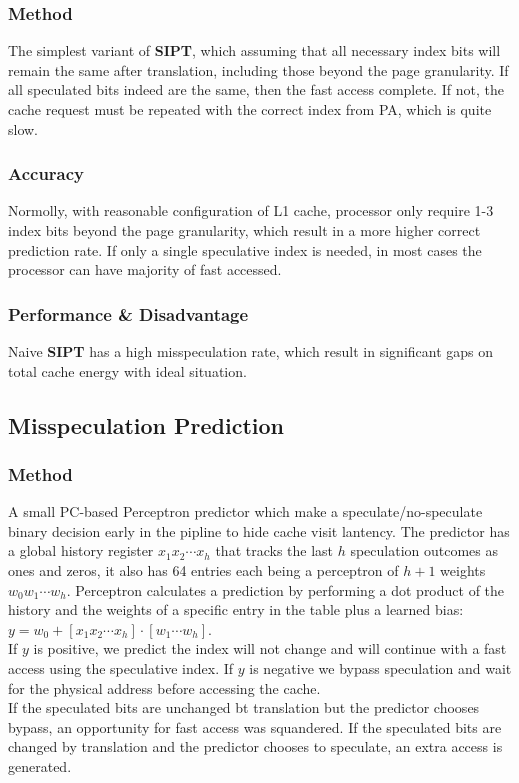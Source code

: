 \documentclass[10pt,a4paper]{article}
\begin{document}
\subsubsection{Method}
The simplest variant of \textbf{SIPT}, which assuming that all necessary index bits will remain the same after translation, including those beyond the page granularity. If all speculated bits indeed are the same, then the fast access complete. If not, the cache request must be repeated with the correct index from PA, which is quite slow.
\subsubsection{Accuracy}
Normolly, with reasonable configuration of L1 cache, processor only require 1-3 index bits beyond the page granularity, which result in a more higher correct prediction rate. If only a single speculative index is needed, in most cases the processor can have majority of fast accessed.
\subsubsection{Performance \& Disadvantage}
Naive \textbf{SIPT} has a high misspeculation rate, which result in significant gaps on total cache energy with ideal situation.

\subsection{Misspeculation Prediction}
\subsubsection{Method}
A small PC-based Perceptron predictor which make a speculate/no-speculate binary decision early in the pipline to hide cache visit lantency. The predictor has a global history register $x_{1}x_{2}\cdots x_{h}$ that tracks the last $h$ speculation outcomes as ones and zeros, it also has 64 entries each being a perceptron of $h+ 1$ weights $w_{0}w_{1}\cdots w_{h}$. Perceptron calculates a prediction by performing a dot product of the history and the weights of a specific entry in the table plus a learned bias: $y = w_{0} + [x_{1}x_{2}\cdots x_{h}]\cdot[w_{1}\cdots w_{h}]$.\\
If $y$ is positive, we predict the index will not change and will continue with a fast access using the speculative index. If $y$ is negative we bypass speculation and wait for the physical address before accessing the cache.\\
If the speculated bits are unchanged bt translation but the predictor chooses bypass, an opportunity for fast access was squandered. If the speculated bits are changed by translation and the predictor chooses to speculate, an extra access is generated.
\end{document}
